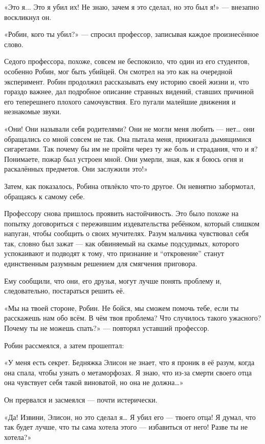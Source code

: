 \documentclass[a5paper, 9pt,
final, openany, twoside=true]{memoir}
\begin{document}
«Это я... Это я убил их! Не знаю, зачем я это сделал, но это был я!» — внезапно воскликнул он.

«Робин, кого ты убил?» — спросил профессор, записывая каждое произнесённое слово.

Седого профессора, похоже, совсем не беспокоило, что один из его студентов, особенно Робин, мог быть убийцей. Он смотрел на это как на очередной эксперимент. Робин продолжил рассказывать ему историю своей жизни и, что гораздо важнее, дал подробное описание странных видений, ставших причиной его теперешнего плохого самочувствия. Его пугали малейшие движения и незнакомые звуки.

«Они! Они называли себя родителями? Они не могли меня любить — нет… они обращались со мной совсем не так. Она пытала меня, прижигала дымящимися сигаретами. Так почему бы им не пройти через ту же боль и страдания, что и я? Понимаете, пожар был устроен мной. Они умерли, зная, как я боюсь огня и раскалённых предметов. Они заслужили это!»

Затем, как показалось, Робина отвлёкло что-то другое. Он невнятно забормотал, обращаясь к самому себе.

Профессору снова пришлось проявить настойчивость. Это было похоже на попытку договориться с пережившим издевательства ребёнком, который слишком напуган, чтобы сообщить о своих мучителях. Разум мальчика чувствовал себя так, словно был зажат — как обвиняемый на скамье подсудимых, которого успокаивают и подводят к тому, что признание и ``откровение'' станут единственным разумным решением для смягчения приговора.

Ему сообщили, что они, его друзья, могут лучше понять проблему и, следовательно, постараться решить её.

«Мы на твоей стороне, Робин. Не бойся, мы сможем помочь тебе, если ты расскажешь нам обо всём. В чём твоя проблема? Что случилось такого ужасного? Почему ты не можешь спать?» — повторял уставший профессор.

Робин рассмеялся, а затем прошептал:

«У меня есть секрет. Бедняжка Элисон не знает, что я проник в её разум, когда она спала, чтобы узнать о метаморфозах. Я знаю, что из-за смерти своего отца она чувствует себя такой виноватой, но она не должна…»

Он прервался и засмеялся — почти истерически.

«Да! Извини, Элисон, но это сделал я… Я убил его — твоего отца! Я думал, что так будет лучше, что ты сама хотела этого — избавиться от него! Разве ты не хотела?»
\end{document}
